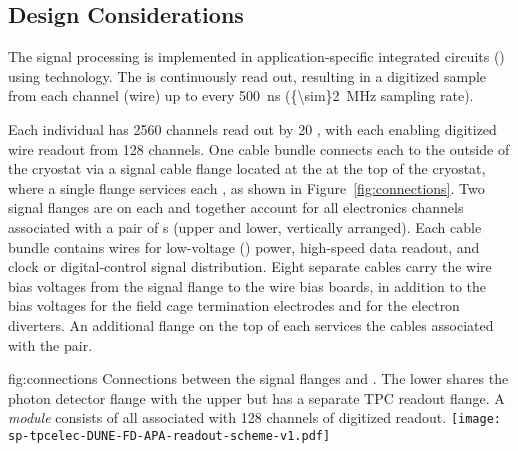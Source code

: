 \subsection{Design Considerations}
\label{sec:fdsp-tpcelec-overview-design}

The  signal processing is implemented in application-specific integrated circuits ()
using  technology.  The  is continuously read out, resulting in a digitized 
sample from each  channel (wire) up to every \SI{500}{ns} (\SI{{\sim}2}{MHz} sampling rate).

Each individual  has \num{2560} channels read out by \num{20} , with
each  enabling digitized wire readout from \num{128} channels.  One cable bundle connects each  to
the outside of the cryostat via a  signal cable flange located at the  \fdth at the
top of the cryostat, where a single flange services each , as shown in Figure~\ref{fig:connections}.  Two  signal flanges are on each \fdth and together account for all electronics channels associated with a pair of s (upper and lower, vertically arranged).
Each cable bundle contains wires for low-voltage () power, high-speed data readout, and
clock or digital-control signal distribution.  Eight separate cables carry the  wire bias voltages
from the signal flange to the  wire bias boards, in addition to the bias voltages for the field
cage termination electrodes and for the electron diverters.  An additional flange on the top of each \fdth services the  cables associated with the  pair.

\begin{dunefigure}
{fig:connections}
{Connections between the signal flanges and . The lower  shares the photon detector flange with the upper  but has a separate TPC readout flange. A \textit{ module} consists of all  associated with \num{128} channels of digitized readout.}
\texttt{[image: sp-tpcelec-DUNE-FD-APA-readout-scheme-v1.pdf]}
\end{dunefigure}


